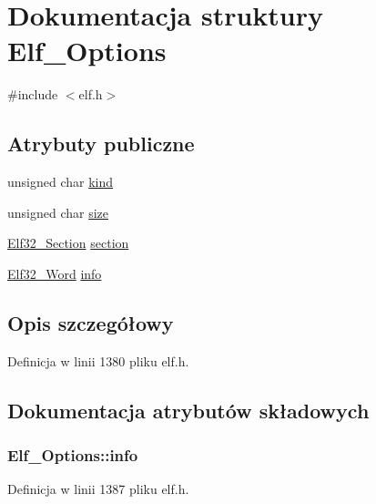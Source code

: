 \hypertarget{struct_elf___options}{\section{Dokumentacja struktury Elf\-\_\-\-Options}
\label{struct_elf___options}
}


{\ttfamily \#include $<$elf.\-h$>$}

\subsection*{Atrybuty publiczne}
\begin{DoxyCompactItemize}
\item 
unsigned char \hyperlink{struct_elf___options_a3732e1185baf21c513ee7618d334d8c5}{kind}
\item 
unsigned char \hyperlink{struct_elf___options_a9a66f1e3a53f76858d3520f151864744}{size}
\item 
\hyperlink{elf_8h_abaffe34cd8a7e31c8f57ebf85c17ca34}{Elf32\-\_\-\-Section} \hyperlink{struct_elf___options_a87449701f0810aa950517897da8ad747}{section}
\item 
\hyperlink{elf_8h_af5924ece606c732e86f8263a19408e45}{Elf32\-\_\-\-Word} \hyperlink{struct_elf___options_a4d25edb0432aa63eda00cb607ae389eb}{info}
\end{DoxyCompactItemize}


\subsection{Opis szczegółowy}


Definicja w linii 1380 pliku elf.\-h.



\subsection{Dokumentacja atrybutów składowych}
\hypertarget{struct_elf___options_a4d25edb0432aa63eda00cb607ae389eb}{
\subsubsection[{info}]{ Elf\-\_\-\-Options\-::info}}\label{struct_elf___options_a4d25edb0432aa63eda00cb607ae389eb}


Definicja w linii 1387 pliku elf.\-h.

